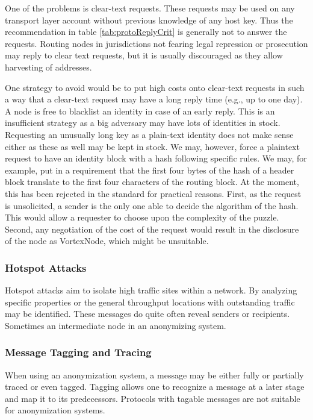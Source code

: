 One of the problems is clear-text requests. These requests may be used on any transport layer account without previous knowledge of any host key. Thus the recommendation in table \ref{tab:protoReplyCrit} is generally not to answer the requests. Routing nodes in jurisdictions not fearing legal repression or prosecution may reply to clear text requests, but it is usually discouraged as they allow harvesting of addresses.

One strategy to avoid would be to put high costs onto clear-text requests in such a way that a clear-text request may have a long reply time (e.g., up to one day). A node is free to blacklist an identity in case of an early reply. This is an insufficient strategy as a big adversary may have lots of identities in stock. Requesting an unusually long key as a plain-text identity does not make sense either as these as well may be kept in stock. We may, however, force a plaintext request to have an identity block with a hash following specific rules. We may, for example, put in a requirement that the first four bytes of the hash of a header block translate to the first four characters of the routing block. At the moment, this has been rejected in the standard for practical reasons. First, as the request is unsolicited, a sender is the only one able to decide the algorithm of the hash. This would allow a requester to choose upon the complexity of the puzzle. Second, any negotiation of the cost of the request would result in the disclosure of the node as VortexNode, which might be unsuitable.

\subsubsection{Hotspot Attacks}
Hotspot attacks aim to isolate high traffic sites within a network. By analyzing specific properties or the general throughput locations with outstanding traffic may be identified. These messages do quite often reveal senders or recipients. Sometimes an intermediate node in an anonymizing system. 

\subsubsection{Message Tagging and Tracing}
When using an anonymization system, a message may be either fully or partially traced or even tagged. Tagging allows one to recognize a message at a later stage and map it to its predecessors. Protocols with tagable messages are not suitable for anonymization systems.

